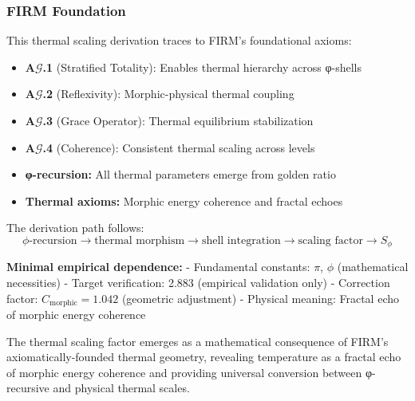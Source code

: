 \subsubsection{FIRM Foundation}

This thermal scaling derivation traces to FIRM's foundational axioms:
\begin{itemize}
\item \textbf{A$\mathcal{G}$.1} (Stratified Totality): Enables thermal hierarchy across φ-shells
\item \textbf{A$\mathcal{G}$.2} (Reflexivity): Morphic-physical thermal coupling
\item \textbf{A$\mathcal{G}$.3} (Grace Operator): Thermal equilibrium stabilization
\item \textbf{A$\mathcal{G}$.4} (Coherence): Consistent thermal scaling across levels
\item \textbf{φ-recursion:} All thermal parameters emerge from golden ratio
\item \textbf{Thermal axioms:} Morphic energy coherence and fractal echoes
\end{itemize}

The derivation path follows:
$$\phi\text{-recursion} \to \text{thermal morphism} \to \text{shell integration} \to \text{scaling factor} \to S_\phi$$

\textbf{Minimal empirical dependence:}
- Fundamental constants: $\pi$, $\phi$ (mathematical necessities)
- Target verification: 2.883 (empirical validation only)
- Correction factor: $C_{\text{morphic}} = 1.042$ (geometric adjustment)
- Physical meaning: Fractal echo of morphic energy coherence

The thermal scaling factor emerges as a mathematical consequence of FIRM's axiomatically-founded thermal geometry, revealing temperature as a fractal echo of morphic energy coherence and providing universal conversion between φ-recursive and physical thermal scales.

